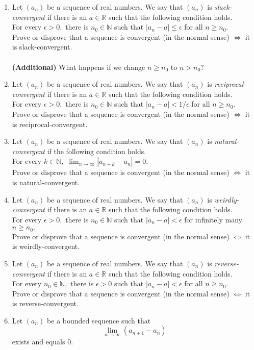 \documentclass{article}
\begin{document}
\begin{enumerate}
	\item Let $(a_n)$ be a sequence of real numbers. We say that $(a_n)$ is \emph{slack-convergent} if there is an $a \in \mathbb{R}$ such that the following condition holds.\\
	For every $\epsilon > 0,$ there is $n_0 \in \mathbb{N}$ such that $|a_n - a| \le \epsilon$ for all $n \ge n_0.$\\
	Prove or disprove that a sequence is convergent (in the normal sense) $\iff$ it is slack-convergent.\\~\\
	\textbf{(Additional)} What happens if we change $n \ge n_0$ to $n > n_0?$
	\item Let $(a_n)$ be a sequence of real numbers. We say that $(a_n)$ is \emph{reciprocal-convergent} if there is an $a \in \mathbb{R}$ such that the following condition holds.\\
	For every $\epsilon > 0,$ there is $n_0 \in \mathbb{N}$ such that $|a_n - a| < 1/\epsilon$ for all $n \ge n_0.$\\
	Prove or disprove that a sequence is convergent (in the normal sense) $\iff$ it is reciprocal-convergent.
	\item Let $(a_n)$ be a sequence of real numbers. We say that $(a_n)$ is \emph{natural-convergent} if the following condition holds.\\
	For every $k \in \mathbb{N},$ $\displaystyle\lim_{n\to \infty}|a_{n+k} - a_n| = 0.$\\
	Prove or disprove that a sequence is convergent (in the normal sense) $\iff$ it is natural-convergent.
	\item Let $(a_n)$ be a sequence of real numbers. We say that $(a_n)$ is \emph{weirdly-convergent} if there is an $a \in \mathbb{R}$ such that the following condition holds.\\
	For every $\epsilon > 0,$ there is $n_0 \in \mathbb{N}$ such that $|a_n - a| < \epsilon$ for infinitely many $n \ge n_0.$\\
	Prove or disprove that a sequence is convergent (in the normal sense) $\iff$ it is weirdly-convergent.
	\item Let $(a_n)$ be a sequence of real numbers. We say that $(a_n)$ is \emph{reverse-convergent} if there is an $a \in \mathbb{R}$ such that the following condition holds.\\
	For every $n_0 \in \mathbb{N},$ there is $\epsilon > 0$ such that $|a_n - a| < \epsilon$ for all $n \ge n_0.$\\
	Prove or disprove that a sequence is convergent (in the normal sense) $\iff$ it is reverse-convergent.
	\item Let $(a_n)$ be a bounded sequence such that
	\begin{equation*} 
		\lim_{n\to \infty}(a_{n+1} - a_n)
	\end{equation*}
	exists and equals $0.$


\end{enumerate}
\end{document}
